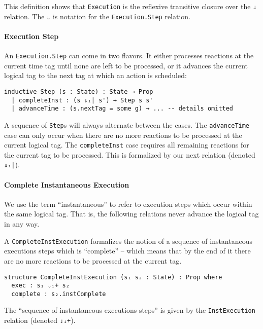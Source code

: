 \vspace*{3mm}

This definition shows that \lstinline{Execution} is the reflexive transitive closure over the \lstinline{⇓} relation.
The \lstinline{⇓} is notation for the \lstinline{Execution.Step} relation.

\paragraph{Execution Step}

An \lstinline{Execution.Step} can come in two flavors.
It either processes reactions at the current time tag until none are left to be processed, or it advances the current logical tag to the next tag at which an action is scheduled:

\begin{lstlisting}
inductive Step (s : State) : State → Prop 
  | completeInst : (s ⇓ᵢ| s') → Step s s'
  | advanceTime : (s.nextTag = some g) → ... -- details omitted
\end{lstlisting}

A sequence of \lstinline{Step}s will always alternate between the cases.
The \lstinline{advanceTime} case can only occur when there are no more reactions to be processed at the current logical tag.
The \lstinline{completeInst} case requires all remaining reactions for the current tag to be processed. 
This is formalized by our next relation (denoted \lstinline{⇓ᵢ|}).

\paragraph{Complete Instantaneous Execution}

We use the term ``instantaneous'' to refer to execution steps which occur within the same logical tag.
That is, the following relations never advance the logical tag in any way.

A \lstinline{CompleteInstExecution} formalizes the notion of a sequence of instantaneous executions steps which is ``complete'' -- which means that by the end of it there are no more reactions to be processed at the current tag.

\begin{lstlisting}
structure CompleteInstExecution (s₁ s₂ : State) : Prop where
  exec : s₁ ⇓ᵢ+ s₂
  complete : s₂.instComplete
\end{lstlisting}

The ``sequence of instantaneous executions steps'' is given by the \lstinline{InstExecution} relation (denoted \lstinline{⇓ᵢ+}).

